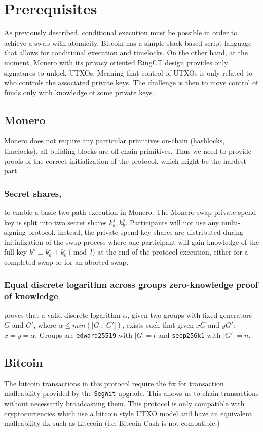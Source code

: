 \documentclass{llncs}
\begin{document}
\section{Prerequisites}
As previously described, conditional execution must be possible in order to achieve a swap with atomicity. Bitcoin has a simple stack-based script language that allows for conditional execution and timelocks. On the other hand, at the moment, Monero with its privacy oriented RingCT design provides only signatures to unlock UTXOs. Meaning that control of UTXOs is only related to who controls the associated private keys. The challenge is then to move control of funds only with knowledge of some private keys.

\subsection{Monero}
Monero does not require any particular primitives on-chain (hashlocks, timelocks), all building blocks are off-chain primitives. Thus we need to provide proofs of the correct initialization of the protocol, which might be the hardest part.

\subsubsection{Secret shares,}
to enable a basic two-path execution in Monero. The Monero swap private spend key is split into two secret shares $k^s_a, k^s_b$. Participants will not use any multi-signing protocol, instead, the private spend key shares are distributed during initialization of the swap process where one participant will gain knowledge of the full key $k^s \equiv k^s_a + k^s_b \pmod l$ at the end of the protocol execution, either for a completed swap or for an aborted swap.

\subsubsection{Equal discrete logarithm across groups zero-knowledge proof of knowledge}
proves that a valid discrete logarithm $\alpha$, given two groups with fixed generators $G$ and $G'$, where $\alpha \leq min(|G|,|G'|)$, exists such that given $xG$ and $yG'$: $x=y=\alpha$. Groups are \texttt{edward25519} with $|G| = l$ and \texttt{secp256k1} with $|G'| = n$.

\subsection{Bitcoin}
\label{bitcoinPrerequisites}
The bitcoin transactions in this protocol require the fix for transaction malleability provided by the \texttt{SegWit} upgrade.  This allows us to chain transactions without necessarily broadcasting them. This protocol is only compatible with cryptocurrencies which use a bitcoin style UTXO model and have an equivalent malleability fix such as Litecoin (i.e. Bitcoin Cash is not compatible.)
\end{document}
